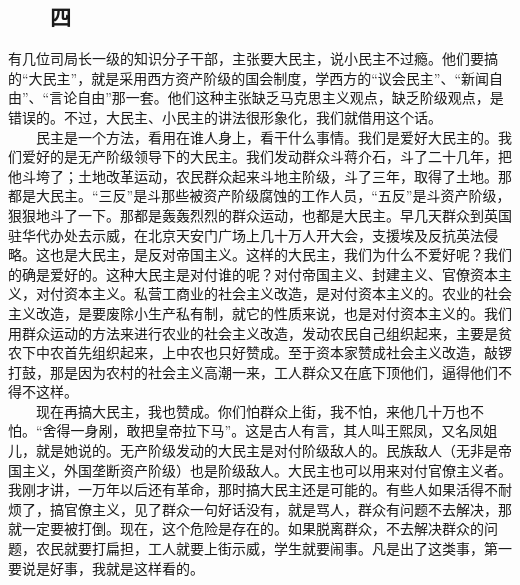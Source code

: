 \documentclass[cn,11pt,chinese]{elegantbook}
\def\myformat#1{\hfil\hfil #1}
\begin{document}
\subsection*{\myformat{　　四}}
有几位司局长一级的知识分子干部，主张要大民主，说小民主不过瘾。他们要搞的“大民主”，就是采用西方资产阶级的国会制度，学西方的“议会民主”、“新闻自由”、“言论自由”那一套。他们这种主张缺乏马克思主义观点，缺乏阶级观点，是错误的。不过，大民主、小民主的讲法很形象化，我们就借用这个话。\\
　　民主是一个方法，看用在谁人身上，看干什么事情。我们是爱好大民主的。我们爱好的是无产阶级领导下的大民主。我们发动群众斗蒋介石，斗了二十几年，把他斗垮了；土地改革运动，农民群众起来斗地主阶级，斗了三年，取得了土地。那都是大民主。“三反”是斗那些被资产阶级腐蚀的工作人员，“五反”是斗资产阶级，狠狠地斗了一下。那都是轰轰烈烈的群众运动，也都是大民主。早几天群众到英国驻华代办处去示威，在北京天安门广场上几十万人开大会，支援埃及反抗英法侵略。这也是大民主，是反对帝国主义。这样的大民主，我们为什么不爱好呢？我们的确是爱好的。这种大民主是对付谁的呢？对付帝国主义、封建主义、官僚资本主义，对付资本主义。私营工商业的社会主义改造，是对付资本主义的。农业的社会主义改造，是要废除小生产私有制，就它的性质来说，也是对付资本主义的。我们用群众运动的方法来进行农业的社会主义改造，发动农民自己组织起来，主要是贫农下中农首先组织起来，上中农也只好赞成。至于资本家赞成社会主义改造，敲锣打鼓，那是因为农村的社会主义高潮一来，工人群众又在底下顶他们，逼得他们不得不这样。\\
　　现在再搞大民主，我也赞成。你们怕群众上街，我不怕，来他几十万也不怕。“舍得一身剐，敢把皇帝拉下马”。这是古人有言，其人叫王熙凤，又名凤姐儿，就是她说的。无产阶级发动的大民主是对付阶级敌人的。民族敌人（无非是帝国主义，外国垄断资产阶级）也是阶级敌人。大民主也可以用来对付官僚主义者。我刚才讲，一万年以后还有革命，那时搞大民主还是可能的。有些人如果活得不耐烦了，搞官僚主义，见了群众一句好话没有，就是骂人，群众有问题不去解决，那就一定要被打倒。现在，这个危险是存在的。如果脱离群众，不去解决群众的问题，农民就要打扁担，工人就要上街示威，学生就要闹事。凡是出了这类事，第一要说是好事，我就是这样看的。\\
\end{document}

